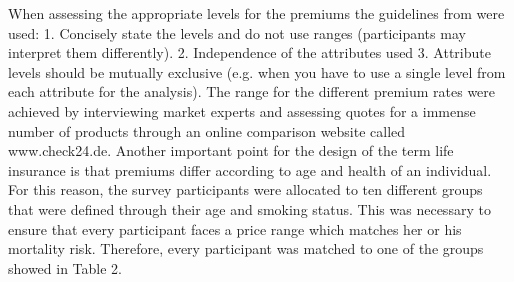 \documentclass[12pt, abstracton]{article}
\begin{document}
When assessing the appropriate levels for the premiums the guidelines from \cite{Orme2002} were used: 1. Concisely state the levels and do not use ranges (participants may interpret them differently). 2. Independence of the attributes used 3. Attribute levels should be mutually exclusive (e.g. when you have to use a single level from each attribute for the analysis). The range for the different premium rates were achieved by interviewing market experts and assessing quotes for a immense number of products through an online comparison website called www.check24.de. Another important point for the design of the term life insurance is that premiums differ according to age and health of an individual. For this reason, the survey participants were allocated to ten different groups that were defined through their age and smoking status. This was necessary to ensure that every participant faces a price range which matches her or his mortality risk. Therefore, every participant was matched to one of the groups showed in Table 2.\\
\end{document}
